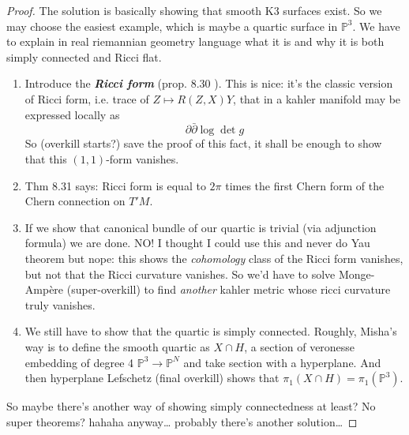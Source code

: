 \begin{proof}\leavevmode
	The solution is basically showing that smooth K3 surfaces exist. So we may choose the easiest example, which is maybe a quartic surface in \(\mathbb{P}^3\). We have to explain in real riemannian geometry language what it is and why it is both simply connected and Ricci flat.
\begin{enumerate}[label=\textbf{Step \arabic*}]
\item Introduce the \textit{\textbf{Ricci form}} (prop. 8.30 \cite{lec}). This is nice: it's the classic version of Ricci form, i.e. trace of \(Z \mapsto R(Z,X)Y\), that in a kahler manifold may be expressed locally as
	\[\partial\bar\partial \operatorname{log} \det g\]
So (overkill starts?) save the proof of this fact, it shall be enough to show that this \((1,1)\)-form vanishes.	
	
\item Thm 8.31 \cite{lec} says: Ricci form is equal to \(2\pi\) times the first Chern form of the Chern connection on \(T'M\).
\item If we show that canonical bundle of our quartic is trivial (via adjunction formula) we are done. NO! I thought I could use this and never do Yau theorem but nope: this shows the \textit{cohomology} class of the Ricci form vanishes, but not that the Ricci curvature vanishes. So we'd have to solve Monge-Ampère (super-overkill) to find \textit{another} kahler metric whose ricci curvature truly vanishes.
\item We still have to show that the quartic is simply connected. Roughly, Misha's way is to define the smooth quartic as \(X \cap H\), a section of veronesse embedding of degree 4 \(\mathbb{P}^3 \to \mathbb{P}^N\) and take section with a hyperplane. And then hyperplane Lefschetz (final overkill) shows that \(\pi_{1}(X \cap H)=\pi_{1}(\mathbb{P}^3)\). \end{enumerate}
So maybe there's another way of showing simply connectedness at least? No super theorems? hahaha anyway… probably there's another solution…


\end{proof}
